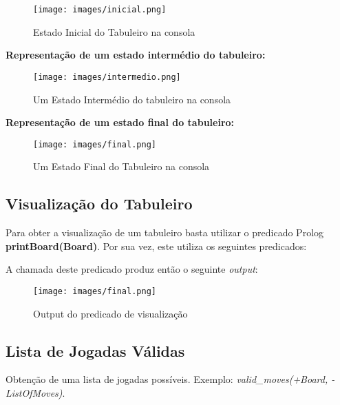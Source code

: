 \documentclass[a4paper]{article}
\begin{document}
\begin{figure}[H]
	\centering
	\texttt{[image: images/inicial.png]}
	\caption{Estado Inicial do Tabuleiro na consola}
	\label{fig:estado_inicial}
\end{figure}
\newpage

\textbf{Representação de um estado intermédio do tabuleiro:}
\linebreak


\begin{figure}[H]
	\centering
	\texttt{[image: images/intermedio.png]}
	\caption{Um Estado Intermédio do tabuleiro na consola}
	\label{fig:estado_intermedio}
\end{figure}
\newpage
\textbf{Representação de um estado final do tabuleiro:}
\linebreak


\begin{figure}[H]
	\centering
	\texttt{[image: images/final.png]}
	\caption{Um Estado Final do Tabuleiro na consola}
	\label{fig:estado_final}
\end{figure}

\newpage

\subsection{Visualização do Tabuleiro} 

Para obter a visualização de um tabuleiro basta utilizar o predicado Prolog  \textbf{printBoard(Board)}. Por sua vez, este utiliza os seguintes predicados: 


A chamada deste predicado produz então o seguinte  \textit{output}:
\begin{figure}[H]
    \centering
    \texttt{[image: images/final.png]}
    \caption{Output do predicado de visualização}
    \label{fig:final_board}
\end{figure}

\subsection{Lista de Jogadas Válidas} Obtenção de uma lista de jogadas possíveis. Exemplo: \textit{valid\_moves(+Board, -ListOfMoves)}.
\end{document}
